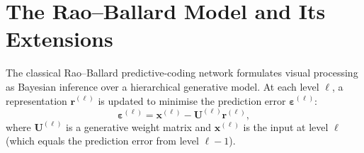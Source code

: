 \section{The Rao--Ballard Model and Its Extensions}

The classical Rao--Ballard predictive-coding network \cite{rao1999} formulates visual
processing as Bayesian inference over a hierarchical generative model.  At each level
$\ell$, a representation $\mathbf{r}^{(\ell)}$ is updated to minimise the prediction
error $\boldsymbol{\varepsilon}^{(\ell)}$:
\begin{equation}
  \boldsymbol{\varepsilon}^{(\ell)} = \mathbf{x}^{(\ell)}
    - \mathbf{U}^{(\ell)}\mathbf{r}^{(\ell)},
  \label{eq:pred-error}
\end{equation}
where $\mathbf{U}^{(\ell)}$ is a generative weight matrix and $\mathbf{x}^{(\ell)}$ is
the input at level $\ell$ (which equals the prediction error from level $\ell-1$).
